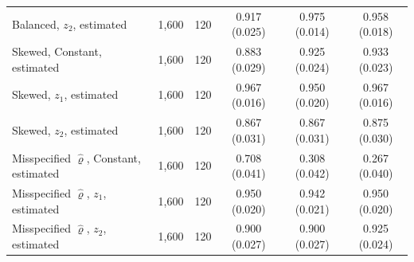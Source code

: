\begin{tabular}{lrrccc}
Balanced, $z_2$, estimated & 1,600 & 120 & 0.917 (0.025) & 0.975 (0.014) & 0.958 (0.018) \\
Skewed, Constant, estimated & 1,600 & 120 & 0.883 (0.029) & 0.925 (0.024) & 0.933 (0.023) \\
Skewed, $z_1$, estimated & 1,600 & 120 & 0.967 (0.016) & 0.950 (0.020) & 0.967 (0.016) \\
Skewed, $z_2$, estimated & 1,600 & 120 & 0.867 (0.031) & 0.867 (0.031) & 0.875 (0.030) \\
Misspecified $\hat\varrho$, Constant, estimated & 1,600 & 120 & 0.708 (0.041) & 0.308 (0.042) & 0.267 (0.040) \\
Misspecified $\hat\varrho$, $z_1$, estimated & 1,600 & 120 & 0.950 (0.020) & 0.942 (0.021) & 0.950 (0.020) \\
Misspecified $\hat\varrho$, $z_2$, estimated & 1,600 & 120 & 0.900 (0.027) & 0.900 (0.027) & 0.925 (0.024) \\
\bottomrule
\end{tabular}
